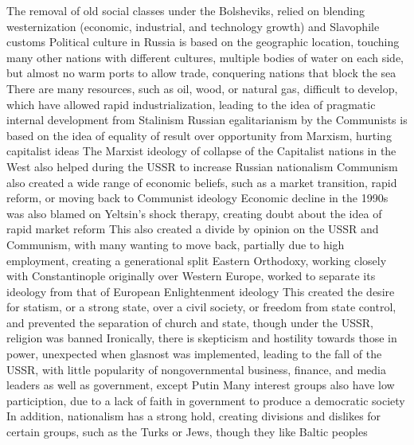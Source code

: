 \documentclass[11 pt, twoside]{article}
\newenvironment{outline*}
{
	\begin{outline}[enumerate]
	}
	{\end{outline}
}
\begin{document}
\begin{outline*}
\3 The removal of old social classes under the Bolsheviks, relied on blending westernization (economic, industrial, and technology growth) and Slavophile customs
\1 Political culture in Russia is based on the geographic location, touching many other nations with different cultures, multiple bodies of water on each side, but almost no warm ports to allow trade, conquering nations that block the sea
\2 There are many resources, such as oil, wood, or natural gas, difficult to develop, which have allowed rapid industrialization, leading to the idea of pragmatic internal development from Stalinism
\2 Russian egalitarianism by the Communists is based on the idea of equality of result over opportunity from Marxism, hurting capitalist ideas
\3 The Marxist ideology of collapse of the Capitalist nations in the West also helped during the USSR to increase Russian nationalism
\3 Communism also created a wide range of economic beliefs, such as a market transition, rapid reform, or moving back to Communist ideology
\3 Economic decline in the 1990s was also blamed on Yeltsin's shock therapy, creating doubt about the idea of rapid market reform
\3 This also created a divide by opinion on the USSR and Communism, with many wanting to move back, partially due to high employment, creating a generational split
\2 Eastern Orthodoxy, working closely with Constantinople originally over Western Europe, worked to separate its ideology from that of European Enlightenment ideology
\3 This created the desire for statism, or a strong state, over a civil society, or freedom from state control, and prevented the separation of church and state, though under the USSR, religion was banned
\2 Ironically, there is skepticism and hostility towards those in power, unexpected when glasnost was implemented, leading to the fall of the USSR, with little popularity of nongovernmental business, finance, and media leaders as well as government, except Putin
\3 Many interest groups also have low particiption, due to a lack of faith in government to produce a democratic society
\2 In addition, nationalism has a strong hold, creating divisions and dislikes for certain groups, such as the Turks or Jews, though they like Baltic peoples
\end{outline*}
\end{document}
